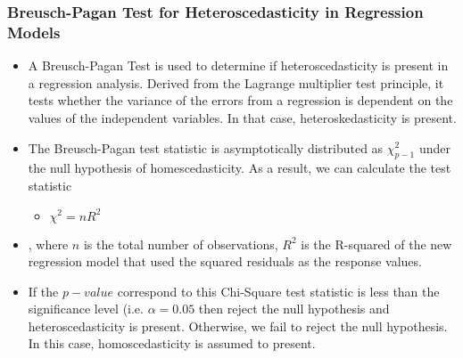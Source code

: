 \documentclass[a4paper]{article}
\begin{document}
\subsubsection{Breusch-Pagan Test for Heteroscedasticity in Regression Models}
\begin{itemize}
    \item[] A Breusch-Pagan Test is used to determine if heteroscedasticity is present in a regression analysis. Derived from the Lagrange multiplier test principle, it tests whether the variance of the errors from a regression is dependent on the values of the independent variables. In that case, heteroskedasticity is present.
    
    \item[] The Breusch-Pagan test statistic is asymptotically distributed as $\chi_{p-1}^2$ under the null hypothesis of homescedasticity. As a result, we can calculate the test statistic
    \begin{itemize}
        \centering
        \large
        \item[] $\chi^2 = nR^2$  
    \end{itemize}
    
    \item[], where $n$ is the total number of observations, $R^2$ is the R-squared of the new regression model that used the squared residuals as the response values.
    
    \item[] If the $p-value$ correspond to this Chi-Square test statistic is less than the significance level (i.e. $\alpha=0.05$ then reject the null hypothesis and heteroscedasticity is present. Otherwise, we fail to reject the null hypothesis. In this case, homoscedasticity is assumed to present.
\end{itemize}
\end{document}
